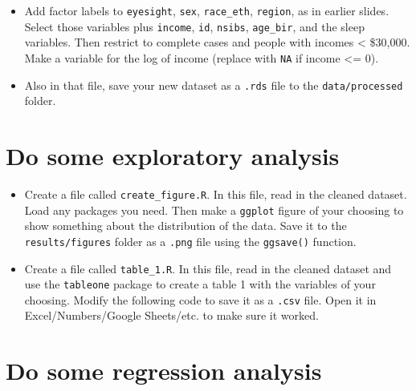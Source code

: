 \documentclass[11pt]{scrartcl}
\newenvironment{Shaded}{\begin{snugshade}}{\end{snugshade}}
\newcommand{\DataTypeTok}[1]{\textcolor[rgb]{0.13,0.29,0.53}{#1}}
\newcommand{\KeywordTok}[1]{\textcolor[rgb]{0.13,0.29,0.53}{\textbf{#1}}}
\newcommand{\NormalTok}[1]{#1}
\newcommand{\OperatorTok}[1]{\textcolor[rgb]{0.81,0.36,0.00}{\textbf{#1}}}
\newcommand{\StringTok}[1]{\textcolor[rgb]{0.31,0.60,0.02}{#1}}
\providecommand{\tightlist}{%
  \setlength{\itemsep}{0pt}\setlength{\parskip}{0pt}}
\begin{document}
\begin{itemize}
\tightlist
\item
  Add factor labels to \texttt{eyesight}, \texttt{sex},
  \texttt{race\_eth}, \texttt{region}, as in earlier slides. Select
  those variables plus \texttt{income}, \texttt{id}, \texttt{nsibs},
  \texttt{age\_bir}, and the sleep variables. Then restrict to complete
  cases and people with incomes \textless{} \$30,000. Make a variable
  for the log of income (replace with \texttt{NA} if income \textless{}=
  0).
\item
  Also in that file, save your new dataset as a \texttt{.rds} file to
  the \texttt{data/processed} folder.
\end{itemize}

\hypertarget{do-some-analysis}{%
\section{Do some exploratory analysis}\label{do-some-analysis}}

\begin{itemize}
\tightlist
\item
  Create a file called \texttt{create\_figure.R}. In this file, read in
  the cleaned dataset. Load any packages you need. Then make a
  \texttt{ggplot} figure of your choosing to show something about the
  distribution of the data. Save it to the \texttt{results/figures}
  folder as a \texttt{.png} file using the \texttt{ggsave()} function.
\item
  Create a file called \texttt{table\_1.R}. In this file, read in the
  cleaned dataset and use the \texttt{tableone} package to create a
  table 1 with the variables of your choosing. Modify the following code
  to save it as a \texttt{.csv} file. Open it in Excel/Numbers/Google
  Sheets/etc. to make sure it worked.
\end{itemize}

\begin{Shaded}
\end{Shaded}

\hypertarget{do-some-more-analysis}{%
\section{Do some regression analysis}\label{do-some-more-analysis}}
\end{document}
